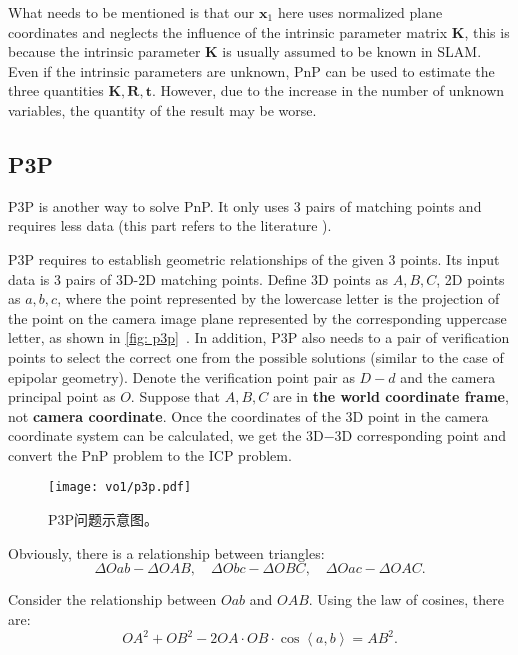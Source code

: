 What needs to be mentioned is that our $\bm{x}_1$ here uses normalized plane coordinates and neglects the influence of the intrinsic parameter matrix $\bm{K}$, this is because the intrinsic parameter $\bm{K}$ is usually assumed to be known in SLAM. Even if the intrinsic parameters are unknown, PnP can be used to estimate the three quantities $\bm{K}, \bm{R}, \bm{t}$. However, due to the increase in the number of unknown variables, the quantity of the result may be worse.

\subsection{P3P}
P3P is another way to solve PnP. It only uses 3 pairs of matching points and requires less data (this part refers to the literature \cite{web:p3p}).

P3P requires to establish geometric relationships of the given 3 points. Its input data is 3 pairs of 3D-2D matching points. Define 3D points as $A, B, C$, 2D points as $a, b, c$, where the point represented by the lowercase letter is the projection of the point on the camera image plane represented by the corresponding uppercase letter, as shown in \autoref{fig: p3p}~. In addition, P3P also needs to a pair of verification points to select the correct one from the possible solutions (similar to the case of epipolar geometry). Denote the verification point pair as $D-d$ and the camera principal point as $O$. Suppose that $A, B, C$ are in \textbf{the world coordinate frame}, not \textbf{camera coordinate}. Once the coordinates of the 3D point in the camera coordinate system can be calculated, we get the 3D−3D corresponding point and convert the PnP problem to the ICP problem.

\begin{figure}[!ht]
	\centering
	\texttt{[image: vo1/p3p.pdf]}
	\caption{P3P问题示意图。}
	\label{fig:p3p}
\end{figure}

Obviously, there is a relationship between triangles:
\begin{equation}
\Delta Oab - \Delta OAB, \quad \Delta Obc - \Delta OBC, \quad \Delta Oac - \Delta OAC.
\end{equation}

Consider the relationship between $Oab$ and $OAB$. Using the law of cosines, there are:
\begin{equation}
O{A^2} + O{B^2} - 2OA \cdot OB \cdot \cos \left\langle a,b \right \rangle  = A{B^2}.
\end{equation}

